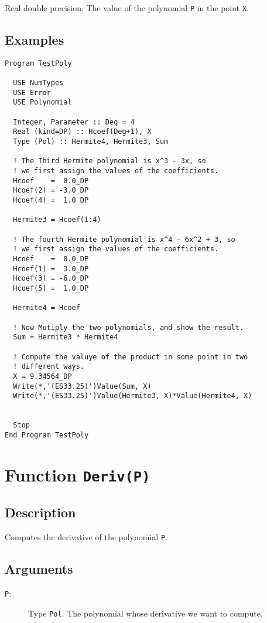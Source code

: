 Real double precision. The value of the polynomial \texttt{P} in the
point \texttt{X}. 

\subsection{Examples}

\begin{verbatim}
Program TestPoly

  USE NumTypes
  USE Error
  USE Polynomial

  Integer, Parameter :: Deg = 4
  Real (kind=DP) :: Hcoef(Deg+1), X
  Type (Pol) :: Hermite4, Hermite3, Sum

  ! The Third Hermite polynomial is x^3 - 3x, so
  ! we first assign the values of the coefficients.
  Hcoef    =  0.0_DP
  Hcoef(2) = -3.0_DP
  Hcoef(4) =  1.0_DP

  Hermite3 = Hcoef(1:4)

  ! The fourth Hermite polynomial is x^4 - 6x^2 + 3, so
  ! we first assign the values of the coefficients.
  Hcoef    =  0.0_DP
  Hcoef(1) =  3.0_DP
  Hcoef(3) = -6.0_DP
  Hcoef(5) =  1.0_DP

  Hermite4 = Hcoef

  ! Now Mutiply the two polynomials, and show the result.
  Sum = Hermite3 * Hermite4
  
  ! Compute the valuye of the product in some point in two 
  ! different ways.
  X = 9.34564_DP
  Write(*,'(ES33.25)')Value(Sum, X)
  Write(*,'(ES33.25)')Value(Hermite3, X)*Value(Hermite4, X)


  Stop
End Program TestPoly
\end{verbatim}


\section{Function \texttt{Deriv(P)}}

\subsection{Description}

Computes the derivative of the polynomial \texttt{P}.

\subsection{Arguments}

\begin{description}
\item[\texttt{P}:] Type \texttt{Pol}. The polynomial whose derivative
  we want to compute.
\end{description}

